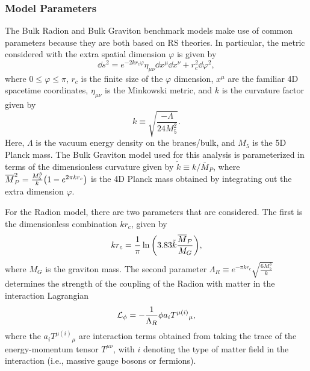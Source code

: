 \subsubsection{Model Parameters}
\label{subsec:param}

The Bulk Radion and Bulk Graviton benchmark models make use of common parameters because they are both based on RS theories.
In particular, the metric considered with the extra spatial dimension $\varphi$ is given by~\cite{carvalho2018gravity}
\begin{equation}
  \dd{s}^2=e^{-2kr_c\varphi}\eta_{\mu\nu}\dd{x}^\mu\dd{x}^\nu+r_c^2\dd{\varphi}^2,
\end{equation}
where $0\leq\varphi\leq\pi$, $r_c$ is the finite size of the $\varphi$ dimension, $x^\mu$ are the familiar 4D spacetime coordinates, $\eta_{\mu\nu}$ is the Minkowski metric, and $k$ is the curvature factor given by
\begin{equation}
  k\equiv\sqrt{\frac{-\Lambda}{24M_5^2}}.
\end{equation}
Here, $\Lambda$ is the vacuum energy density on the branes/bulk, and $M_5$ is the 5D Planck mass.
The Bulk Graviton model used for this analysis is parameterized in terms of the dimensionless curvature given by $\tilde{k}\equiv{k/\overline{M}_P}$, where $\overline{M}_P^2=\frac{M_5^3}{k}\pqty{1-e^{2\pi kr_c}}$ is the 4D Planck mass obtained by integrating out the extra dimension $\varphi$.

For the Radion model, there are two parameters that are considered.
The first is the dimensionless combination $kr_c$, given by
\begin{equation}
  kr_c=\frac{1}{\pi}\ln\pqty{3.83\tilde{k}\frac{\overline{M}_P}{M_G}},
\end{equation}
where $M_G$ is the graviton mass.
The second parameter $\Lambda_R\equiv e^{-\pi kr_c}\sqrt{\frac{6M_5^3}{k}}$ determines the strength of the coupling of the Radion with matter in the interaction Lagrangian
\begin{equation}
  \mathcal{L}_\phi=-\frac{1}{\Lambda_R}\phi a_iT^{\mu(i)}{}_\mu,
\end{equation}
where the $a_iT^{\mu(i)}{}_\mu$ are interaction terms obtained from taking the trace of the energy-momentum tensor $T^{\mu\nu}$, with $i$ denoting the type of matter field in the interaction (i.e., massive gauge bosons or fermions).

